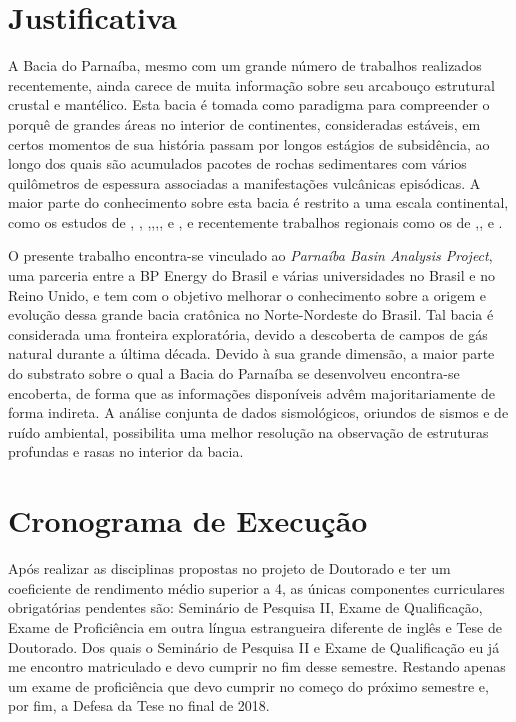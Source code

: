 \section{Justificativa}

A Bacia do Parnaíba, mesmo com um grande número de trabalhos realizados recentemente, ainda carece de muita informação sobre seu arcabouço estrutural crustal e mantélico. Esta bacia é tomada como paradigma para compreender o porquê de grandes áreas no interior de continentes, consideradas estáveis, em certos momentos de sua história passam por longos estágios de subsidência, ao longo dos quais são acumulados pacotes de rochas sedimentares com vários quilômetros de espessura associadas a manifestações vulcânicas episódicas. A maior parte do conhecimento sobre esta bacia é restrito a uma escala continental, como os estudos de \cite{feng_group_velocity_2004}, \cite{feng_upper_2007}, \cite{lloyd_moho_2010},\cite{van_der_meijde_gravity_2013},\cite{assumpcao_crustal_2013},\cite{assumpcao_models_2013},\cite{goutorbe_rayleigh_2015} e \cite{uieda_fast_2017}, e recentemente trabalhos regionais como os de \cite{de_castro_crustal_2014},\cite{daly_brasiliano_2014}, \cite{de_castro_geophysical_2016} e \cite{tozer_crustal_2017}. 

O presente trabalho encontra-se vinculado ao \textit{Parnaíba Basin Analysis Project}, uma parceria entre a BP Energy do Brasil  e várias universidades no Brasil e no Reino Unido, e tem com o objetivo melhorar o conhecimento sobre a origem e evolução dessa grande bacia cratônica no Norte-Nordeste do Brasil. Tal bacia é considerada uma fronteira exploratória, devido a descoberta de campos de gás natural durante a última década. Devido à sua grande dimensão, a maior parte do substrato sobre o qual a Bacia do Parnaíba se desenvolveu encontra-se encoberta, de forma que as informações disponíveis advêm majoritariamente de forma indireta. A análise conjunta de dados sismológicos, oriundos de sismos e de ruído ambiental, possibilita uma melhor resolução na observação de estruturas profundas e rasas no interior da bacia.

\section{Cronograma de Execução}

Após realizar as disciplinas propostas no projeto de Doutorado e ter um coeficiente de rendimento médio superior a 4, as únicas componentes curriculares obrigatórias pendentes são: Seminário de Pesquisa II, Exame de Qualificação, Exame de Proficiência em outra língua estrangueira diferente de inglês e Tese de Doutorado. Dos quais o Seminário de Pesquisa II e Exame de Qualificação eu já me encontro matriculado e devo cumprir no fim desse semestre. Restando apenas um exame de proficiência que devo cumprir no começo do próximo semestre e, por fim, a Defesa da Tese no final de 2018. 

